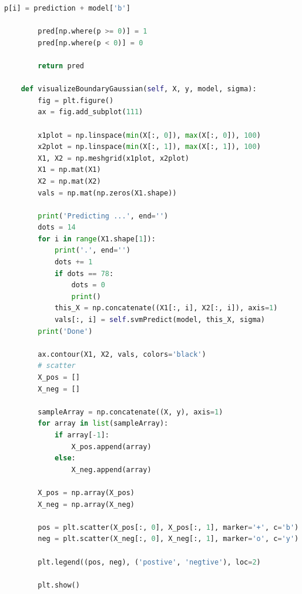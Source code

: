 \documentclass[UTF-8, a4paper, 10pt]{article}
\numberwithin{equation}{section}
\begin{document}
\begin{lstlisting}[language=python]
                p[i] = prediction + model['b']

        pred[np.where(p >= 0)] = 1
        pred[np.where(p < 0)] = 0

        return pred

    def visualizeBoundaryGaussian(self, X, y, model, sigma):
        fig = plt.figure()
        ax = fig.add_subplot(111)

        x1plot = np.linspace(min(X[:, 0]), max(X[:, 0]), 100)
        x2plot = np.linspace(min(X[:, 1]), max(X[:, 1]), 100)
        X1, X2 = np.meshgrid(x1plot, x2plot)
        X1 = np.mat(X1)
        X2 = np.mat(X2)
        vals = np.mat(np.zeros(X1.shape))

        print('Predicting ...', end='')
        dots = 14
        for i in range(X1.shape[1]):
            print('.', end='')
            dots += 1
            if dots == 78:
                dots = 0
                print()
            this_X = np.concatenate((X1[:, i], X2[:, i]), axis=1)
            vals[:, i] = self.svmPredict(model, this_X, sigma)
        print('Done')

        ax.contour(X1, X2, vals, colors='black')
        # scatter
        X_pos = []
        X_neg = []

        sampleArray = np.concatenate((X, y), axis=1)
        for array in list(sampleArray):
            if array[-1]:
                X_pos.append(array)
            else:
                X_neg.append(array)

        X_pos = np.array(X_pos)
        X_neg = np.array(X_neg)

        pos = plt.scatter(X_pos[:, 0], X_pos[:, 1], marker='+', c='b')
        neg = plt.scatter(X_neg[:, 0], X_neg[:, 1], marker='o', c='y')

        plt.legend((pos, neg), ('postive', 'negtive'), loc=2)

        plt.show()

\end{lstlisting}
\end{document}
